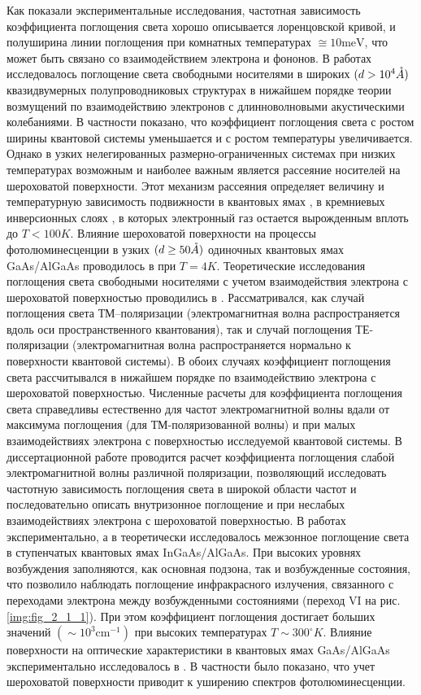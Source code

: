 {Как показали экспериментальные исследования, частотная зависимость коэффициента поглощения света хорошо описывается лоренцовской кривой, и полуширина линии поглощения при комнатных температурах $\cong 10 \text{meV}$, что может быть связано со взаимодействием электрона и фононов. В работах \cite{Wu1994,Spector1983} исследовалось поглощение света свободными носителями в широких $(d > 10^4 \AA)$ квазидвумерных полупроводниковых структурах в нижайшем порядке теории возмущений по взаимодействию электронов с длинноволновыми акустическими колебаниями. В частности показано, что коэффициент поглощения света с ростом ширины квантовой системы уменьшается и с ростом температуры увеличивается. Однако в узких нелегированных размерно-ограниченных системах при низких температурах возможным и наиболее важным является рассеяние носителей на шероховатой поверхности. Этот механизм рассеяния определяет величину и температурную зависимость подвижности в квантовых ямах \cite{Sakaki1987}, в кремниевых инверсионных слоях \cite{Stern1980}, в которых электронный газ остается вырожденным вплоть до $T < 100 K$. Влияние шероховатой поверхности на процессы фотолюминесценции в узких $(d \geq 50 \AA)$ одиночных квантовых ямах GaAs/AlGaAs  проводилось в \cite{Gurioli1991} при $T = 4 K$. Теоретические исследования поглощения света свободными носителями с учетом взаимодействия электрона с шероховатой поверхностью проводились в \cite{Vurgaftman1999}. Рассматривался, как случай поглощения света ТМ–поляризации (электромагнитная волна распространяется вдоль оси пространственного квантования), так и случай поглощения ТЕ-поляризации (электромагнитная волна распространяется нормально к поверхности квантовой системы). В обоих случаях коэффициент поглощения света рассчитывался в нижайшем порядке по взаимодействию электрона с шероховатой поверхностью. Численные расчеты для коэффициента поглощения света справедливы естественно для частот электромагнитной волны вдали от максимума поглощения (для ТМ-поляризованной волны) и при малых взаимодействиях электрона с поверхностью исследуемой квантовой системы. {\color{red} В диссертационной работе проводится расчет коэффициента поглощения слабой электромагнитной волны различной поляризации, позволяющий исследовать частотную зависимость поглощения света в широкой области частот и последовательно описать внутризонное поглощение и при неслабых взаимодействиях электрона с шероховатой поверхностью.}
В работах \cite{Aleshkin2002,Vorobiev2004} экспериментально, а в \cite{Thammasat1997} теоретически исследовалось межзонное поглощение света в ступенчатых квантовых ямах InGaAs/AlGaAs. При высоких уровнях возбуждения заполняются, как основная подзона, так и возбужденные состояния, что позволило наблюдать поглощение инфракрасного излучения, связанного с переходами электрона между возбужденными состояниями (переход VI на рис. \ref{img:fig_2_1_1}). При этом коэффициент поглощения достигает больших значений $(\sim 10^3 \text{cm}^{-1})$ при высоких температурах $T\sim300^{\circ}K$. Влияние поверхности на оптические характеристики в квантовых ямах GaAs/AlGaAs экспериментально исследовалось в \cite{Gurioli1991,Weisbuch1981}. В частности было показано, что учет шероховатой поверхности приводит к уширению спектров фотолюминесценции.	
			
}

